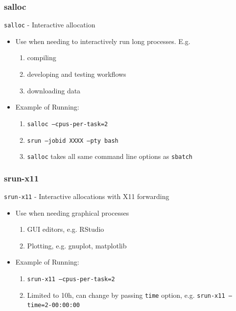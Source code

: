 \documentclass{beamer}
\newcommand{\code}[1]{\colorbox{codegray}{\texttt{#1}}}
\begin{document}
\begin{frame}
\frametitle{salloc}
\code{salloc} - Interactive allocation 
\bigskip
\begin{itemize}
    \item Use when needing to interactively run long processes. E.g.
        \begin{enumerate}
            \item compiling
            \bigskip
            \pause 
            \item developing and testing workflows
            \bigskip
            \pause 
            \item downloading data
            \bigskip
        \end{enumerate}
    \pause
    
    \item Example of Running:
    \bigskip
    \begin{enumerate}
        \item \code{salloc --cpus-per-task=2}
        \pause
        \bigskip
        \item \code{srun  --jobid XXXX --pty bash}
        \pause
        \bigskip
        \item \code{salloc} takes all same command line options as \code{sbatch}
    \end{enumerate}
\end{itemize}
\end{frame}


\begin{frame}
\frametitle{srun-x11}
\code{srun-x11} - Interactive allocations with X11 forwarding
\bigskip
\begin{itemize}
    \item Use when needing graphical processes
        \bigskip
        \begin{enumerate}
            \item GUI editors, e.g. RStudio
            \bigskip
            \pause 
            \item Plotting, e.g. gnuplot, matplotlib
            \bigskip
        \end{enumerate}
    \pause
    \item Example of Running:
    \bigskip
    \begin{enumerate}
        \item \code{srun-x11 --cpus-per-task=2}
        \bigskip
        \pause
        \item Limited to 10h, can change by passing \code{time} option, e.g. \code{srun-x11 --time=2-00:00:00}
    \end{enumerate}
\end{itemize}
\end{frame}
\end{document}

